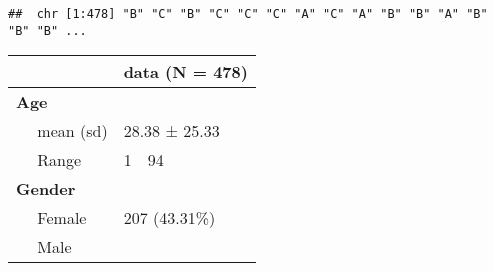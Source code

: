 \documentclass[
]{article}
\begin{document}
\begin{verbatim}
##  chr [1:478] "B" "C" "B" "C" "C" "C" "A" "C" "A" "B" "B" "A" "B" "B" "B" ...
\end{verbatim}

\begin{longtable}[]{@{}ll@{}}
\toprule
\begin{minipage}[b]{0.73\columnwidth}\raggedright
\strut
\end{minipage} & \begin{minipage}[b]{0.21\columnwidth}\raggedright
data (N = 478)\strut
\end{minipage}\tabularnewline
\midrule
\endhead
\begin{minipage}[t]{0.73\columnwidth}\raggedright
\textbf{Age}\strut
\end{minipage} & \begin{minipage}[t]{0.21\columnwidth}\raggedright
~~\strut
\end{minipage}\tabularnewline
\begin{minipage}[t]{0.73\columnwidth}\raggedright
~~ mean (sd)\strut
\end{minipage} & \begin{minipage}[t]{0.21\columnwidth}\raggedright
28.38 ± 25.33\strut
\end{minipage}\tabularnewline
\begin{minipage}[t]{0.73\columnwidth}\raggedright
~~ Range\strut
\end{minipage} & \begin{minipage}[t]{0.21\columnwidth}\raggedright
1~~94\strut
\end{minipage}\tabularnewline
\begin{minipage}[t]{0.73\columnwidth}\raggedright
\textbf{Gender}\strut
\end{minipage} & \begin{minipage}[t]{0.21\columnwidth}\raggedright
~~\strut
\end{minipage}\tabularnewline
\begin{minipage}[t]{0.73\columnwidth}\raggedright
~~ Female\strut
\end{minipage} & \begin{minipage}[t]{0.21\columnwidth}\raggedright
207 (43.31\%)\strut
\end{minipage}\tabularnewline
\begin{minipage}[t]{0.73\columnwidth}\raggedright
~~ Male\strut
\end{minipage} & \begin{minipage}[t]{0.21\columnwidth}\raggedright

\end{minipage}
\end{longtable}
\end{document}
